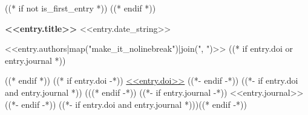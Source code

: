 ((* if not is_first_entry *))
\vspace{<<design.margins.entry_area.vertical_between>>}
((* endif *))

\begin{onecolentry}
    \begin{minipage}{\linewidth}
        \textbf{<<entry.title>>} \hfill <<entry.date_string>>

        \vspace{<<design.margins.highlights_area.vertical_between_bullet_points>>}

        <<entry.authors|map("make_it_nolinebreak")|join(", ")>>
        ((* if entry.doi or entry.journal *))
        \vspace{<<design.margins.highlights_area.vertical_between_bullet_points>>}

        ((* endif *))
        ((* if entry.doi -*))
        \href{<<entry.doi_url>>}{<<entry.doi>>}
        ((*- endif -*))
        ((*- if entry.doi and entry.journal *)) (((* endif -*))
        ((*- if entry.journal -*))
        <<entry.journal>>
        ((*- endif -*))
        ((*- if entry.doi and entry.journal *)))((* endif -*))
    \end{minipage}
\end{onecolentry}
